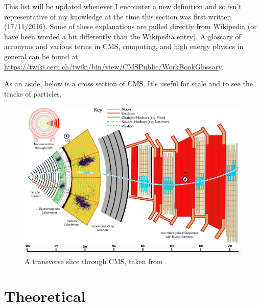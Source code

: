 This list will be updated whenever I encounter a new definition and so isn't representative of my knowledge at the time this section was first written (17/11/2016). Some of these explanations are pulled directly from Wikipedia (or have been worded a bit differently than the Wikipedia entry). A glossary of acronyms and various terms in CMS, computing, and high energy physics in general can be found at \url{https://twiki.cern.ch/twiki/bin/view/CMSPublic/WorkBookGlossary}.

As an aside, below is a cross section of CMS. It's useful for scale and to see the tracks of particles.

\begin{figure}[H]
\centering
\includegraphics[width=\textwidth]{./sec14/Transverse_slice_CMS.png}
\caption{A transverse slice through CMS, taken from \cite{CMS-PRF-14-001}.}
\end{figure}


\section{Theoretical}

